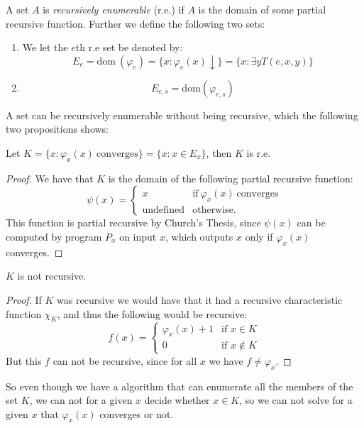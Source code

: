 \documentclass[../main.tex]{subfiles}
\begin{document}
\begin{defi}
	A set $A$ is \textit{recursively enumerable} (r.e.) if $A$ is the domain of some
	partial recursive function. Further we define the following two sets:
	\begin{enumerate}
		\item We let the $e$th r.e set be denoted by:
			\[E_e=\text{dom}\ (\varphi_e)= \{x:\varphi_e(x)\downarrow\}=\{x:\exists
			y T(e,x,y)\}\]
		\item \[E_{e,s}=\text{dom} (\varphi_{e,s})\]
	\end{enumerate}
\end{defi}
A set can be recursively enumerable without being recursive, which the
following two propositions shows:
\begin{prop}
	Let $K=\{x:\varphi_x(x)\ \text{converges}\}=\{x:x\in E_x\}$, then $K$
	is r.e.
\end{prop}
\begin{proof}
	We have that $K$ is the domain of the following partial recursive
	function:
	\[\psi(x)=\begin{cases}
		x &\text{if}\ \varphi_x(x)\ \text{converges}\\
		\text{undefined} &\text{otherwise.}
	\end{cases}\]
	This function is partial recursive by Church's Thesis, since $\psi(x)$
	can be computed by program $P_x$ on input $x$, which outputs $x$ only
	if $\varphi_x(x)$ converges.
\end{proof}
\begin{prop}
	$K$ is not recursive.
\end{prop}
\begin{proof}
	If $K$ was recursive we would have that it had a recursive characteristic
	function $\chi_K$, and thus the following would be recursive:
	\[f(x)=\begin{cases}
		\varphi_x(x)+1 & \text{if } x\in K\\
		0 & \text{if } x\not \in K
	\end{cases}\]
	But this $f$ can not be recursive, since for all $x$ we have $f\not
	=\varphi_x$.
\end{proof}

So even though we have a algorithm that can enumerate all the members of the
set $K$, we can not for a given $x$ decide whether $x\in K$, so we can not
solve for a given $x$ that $\varphi_x(x)$ converges or not.
\end{document}
